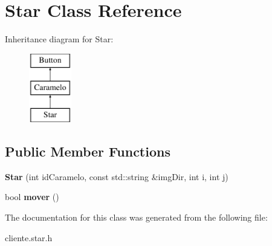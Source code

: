 \hypertarget{classStar}{\section{Star Class Reference}
\label{classStar}
}
Inheritance diagram for Star\-:\begin{figure}[H]
\begin{center}
\leavevmode
\includegraphics[height=3.000000cm]{classStar}
\end{center}
\end{figure}
\subsection*{Public Member Functions}
\begin{DoxyCompactItemize}
\item 
\hypertarget{classStar_a87aed798f84d9e121430ce9675074937}{{\bfseries Star} (int id\-Caramelo, const std\-::string \&img\-Dir, int i, int j)}\label{classStar_a87aed798f84d9e121430ce9675074937}

\item 
\hypertarget{classStar_aafa59ff0555adfb746cc40c58847fa30}{bool {\bfseries mover} ()}\label{classStar_aafa59ff0555adfb746cc40c58847fa30}

\end{DoxyCompactItemize}


The documentation for this class was generated from the following file\-:\begin{DoxyCompactItemize}
\item 
cliente.\-star.\-h\end{DoxyCompactItemize}
